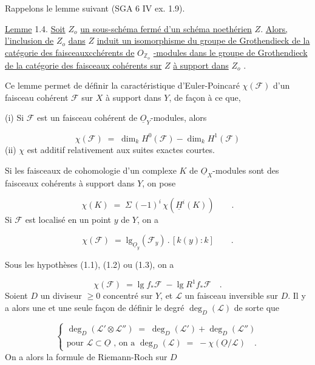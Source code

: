 Rappelons le lemme suivant (SGA 6 IV ex. 1.9).

\underline{Lemme} 1.4. \underline{Soit} $Z_o$ \underline{un sous-schéma fermé d'un schéma noethérien} $Z$. \underline{Alors, l'inclusion de} $Z_o$ \underline{dans} $Z$ \underline{induit un isomorphisme du groupe de Grothendieck de la catégorie des faisceauxcchérents de} $O_{\mathbb{Z}_o}$ \underline{-modules dans le groupe de Grothendieck de la catégorie des faisceaux cohérents sur} $Z$ \underline{à support dans} $Z_o$ .

Ce lemme permet de définir la caractéristique d'Euler-Poincaré $\chi(\mathcal{F})$ d'un faisceau cohérent $\mathcal{F}$ sur $X$ à support dans $Y$, de façon à ce que,

(i) Si $\mathcal{F}$ est un faisceau cohérent de $\underline{O}_Y$-modules, alors

\begin{equation}\tag{1.4.1}
\chi(\mathcal{F}) \;=\; \dim_k H^0(\mathcal{F}) - \dim_k H^1(\mathcal{F})
\end{equation}
(ii) $\chi$ est additif relativement aux suites exactes courtes.

Si les faisceaux de cohomologie d'un complexe $K$ de $\underline{O}_X$-modules sont des faisceaux cohérents à support dans $Y$, on pose

\begin{equation}\tag{1.4.2}
\chi(K) \;=\; \Sigma \, (-1)^i \, \chi(\underline{H}^i(K)) \qquad .
\end{equation}
Si $\mathcal{F}$ est localisé en un point $y$ de $Y$, on a

\begin{equation}\tag{1.4.3}
\chi(\mathcal{F}) \;=\; \mathrm{lg}_{\underline{O}_y}(\mathcal{F}_y) \, . \, [k(y) : k] \qquad .
\end{equation}


Sous les hypothèses (1.1), (1.2) ou (1.3), on a

\begin{equation}\tag{1.4.4}
\chi(\mathcal{F}) \;=\; \mathrm{lg}\; f_{*}\mathcal{F} \;-\; \mathrm{lg}\; R^{1}f_{*}\mathcal{F} \quad .
\end{equation}
Soient $D$ un diviseur $\geq 0$ concentré sur $Y$, et $\mathcal{L}$ un faisceau inversible sur $D$. Il y a alors une et une seule façon de définir le degré $\deg_D(\mathcal{L})$ de sorte que

\begin{equation}\tag{1.4.5}
\left\{
\begin{array}{l}
\deg_D(\mathcal{L}' \otimes \mathcal{L}'') \;=\; \deg_D(\mathcal{L}') + \deg_D(\mathcal{L}'') \\[3ex]
\text{pour } \mathcal{L} \subset \underline{O} \text{ , on a } \deg_D(\mathcal{L}) \;=\; - \chi(\underline{O}/\mathcal{L}) \quad .
\end{array}
\right.
\end{equation}
On a alors la formule de Riemann-Roch sur $D$

